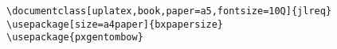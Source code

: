 \documentclass[uplatex,book,paper=a5,fontsize=10Q]{jlreq}
\begin{document}
\begin{verbatim}
\documentclass[uplatex,book,paper=a5,fontsize=10Q]{jlreq}
\usepackage[size=a4paper]{bxpapersize}
\usepackage{pxgentombow}
\end{verbatim}
\end{document}
